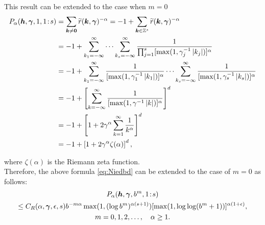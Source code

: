 \documentclass{iitthesis-au} %
\newcommand{\tr}{\widetilde{r}}
\newcommand{\appxintn}{\appxint_n}
\DeclareMathOperator{\appxint}{\hat{I}}
\newcommand{\onetos}{1\!:\!s}
\begin{document}
This result can be extended to the case when $m = 0$
\begin{align*}
    P_{\alpha}(\vh,\vgamma,1,\onetos) & = \sum_{\vk \ne \vzero} \tr(\vk, \vgamma)^{-\alpha} = -1 + \sum_{\vk \in \integers^s} \tr(\vk,\vgamma)^{-\alpha} \\
    & = -1 + \sum_{k_1 =-\infty}^{\infty} \cdots \sum_{k_s  =-\infty}^{\infty} \frac{1}{\prod_{j=1}^s[\max(1,\gamma_j^{-1}\abs{k_j})]^\alpha} \\
    & = -1 + \sum_{k_1 =-\infty}^{\infty} \frac{1}{[\max(1,\gamma_1^{-1}\abs{k_1})]^\alpha} \cdots \sum_{k_s  =-\infty}^{\infty} \frac{1}{[\max(1,\gamma_s^{-1}\abs{k_s})]^\alpha} \\
    & = -1 + \left[\sum_{k =-\infty}^{\infty} \frac{1}{[\max(1,\gamma^{-1}\abs{k})]^\alpha} \right]^d \\
    & = -1 + \left[1 + 2 \gamma^{\alpha} \sum_{k =1}^{\infty} \frac{1}{k^\alpha} \right]^d \\
    & = -1 + \left[1 + 2 \gamma^{\alpha}\zeta(\alpha) \right]^d,
\end{align*}

where $\zeta(\alpha)$ is the Riemann zeta function. \\

Therefore, the above formula \eqref{eq:Niedbd} can be extended to the case of $m=0$ as follows:
\begin{multline} \label{eq:Palphaextm}
    P_{\alpha}(\vh,\vgamma,b^m,\onetos) \\
    \le C_{R}(\alpha,\vgamma,\epsilon,s)
    b^{-m\alpha}\max(1, (\log b^{m})^{\alpha(s+1)})[\max(1,\log \log (
    b^m+1))]^{\alpha(1+\epsilon)}, \\ m =0, 1, 2,\ldots, \quad \alpha \ge 1.
\end{multline}


\end{document}
